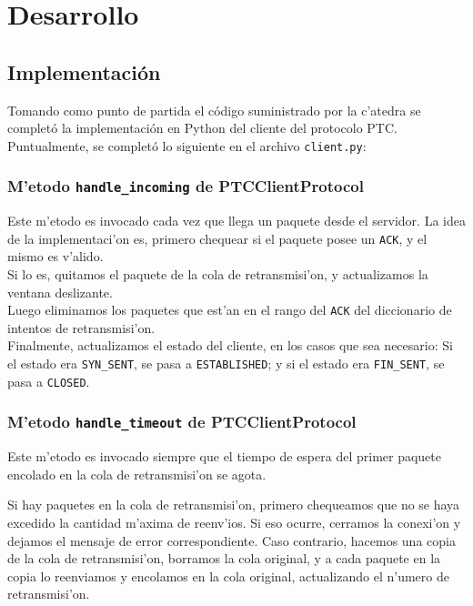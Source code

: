 \section{Desarrollo}

\subsection{Implementación}

Tomando como punto de partida el código suministrado por la c'atedra se completó la implementación en Python del cliente del protocolo PTC. Puntualmente, se completó lo siguiente en el archivo \texttt{client.py}:

\subsubsection{M'etodo \texttt{handle\_incoming} de PTCClientProtocol}

Este m'etodo es invocado cada vez que llega un paquete desde el servidor. La idea de la implementaci'on es, primero chequear si el paquete posee un \texttt{ACK}, y el mismo es v'alido. \\
Si lo es, quitamos el paquete de la cola de retransmisi'on, y actualizamos la ventana deslizante. \\
Luego eliminamos los paquetes que est'an en el rango del \texttt{ACK} del diccionario de intentos de retransmisi'on.  \\
Finalmente, actualizamos el estado del cliente, en los casos que sea necesario: Si el estado era \texttt{SYN\_SENT}, se pasa a \texttt{ESTABLISHED}; y si el estado era \texttt{FIN\_SENT}, se pasa a \texttt{CLOSED}.

\subsubsection{M'etodo \texttt{handle\_timeout} de PTCClientProtocol}

Este m'etodo es invocado siempre que el tiempo de espera del primer paquete encolado en la cola de retransmisi'on se agota.

Si hay paquetes en la cola de retransmisi'on, primero chequeamos que no se haya excedido la cantidad m'axima de reenv'ios. Si eso ocurre, cerramos la conexi'on y dejamos el mensaje de error correspondiente. Caso contrario, hacemos una copia de la cola de retransmisi'on, borramos la cola original, y a cada paquete en la copia lo reenviamos y encolamos en la cola original, actualizando el n'umero de retransmisi'on.


